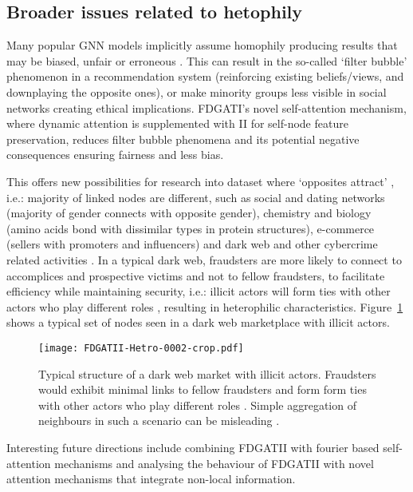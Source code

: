 \documentclass{article}
\begin{document}
\subsection{Broader issues related to hetophily}
Many popular GNN models implicitly assume homophily producing results that may be biased, unfair or erroneous \cite{zhu2020beyond}. This can result in the so-called ‘filter bubble’ phenomenon  in a recommendation system (reinforcing existing beliefs/views, and downplaying the opposite ones), or make minority groups less visible in social networks creating ethical implications\cite{chitra2020analyzing}. FDGATI’s novel self-attention mechanism, where dynamic attention is supplemented with II for self-node feature preservation, reduces filter bubble phenomena and its potential negative consequences ensuring fairness and less bias.



This offers new possibilities for research into dataset where ‘opposites attract’ , i.e.: majority of linked nodes are different, such as social and dating networks (majority of gender connects with opposite gender), chemistry and biology (amino acids bond with dissimilar types in protein structures), e-commerce (sellers with promoters and influencers) and dark web and other cybercrime related activities \cite{zhu2020beyond}. In a typical dark web, fraudsters are more likely to connect to accomplices and prospective victims and not to fellow fraudsters, to facilitate efficiency while maintaining security, i.e.:  illicit actors will form ties with other actors who play different roles \cite{bright2019illicit}, resulting in heterophilic characteristics. Figure~\ref{fig_hetro} shows a typical set of nodes seen in a dark web marketplace with illicit actors.

\begin{figure}[h]
    \centering \texttt{[image: FDGATII-Hetro-0002-crop.pdf]} 
    \caption{Typical structure of a dark web market with illicit actors. Fraudsters would exhibit minimal links to fellow fraudsters and form form ties with other actors who play different roles \cite{bright2019illicit}. Simple aggregation of neighbours in such a scenario can be misleading \cite{alon2020bottleneck}.}
    \label{fig_hetro}
\end{figure}

Interesting future directions include combining FDGATII with fourier  based self-attention mechanisms \cite{lee2021fnet} and analysing the behaviour of FDGATII with novel attention mechanisms that integrate non-local information. 
\end{document}
